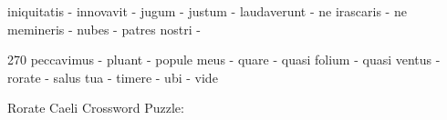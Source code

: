 \documentclass[12pt]{article}
\begin{document}
\pagestyle{fancy}
\fancyhf{}
\renewcommand{\headrulewidth}{0pt} %
  \renewcommand{\footrulewidth}{0pt}
\libertine
\renewcommand\PuzzleClueFont{\rm\normalsize}
\begin{rotate}{0}
\small  iniquitatis - innovavit - jugum - justum - laudaverunt - ne irascaris - ne memineris - nubes - patres nostri -
\end{rotate}
\hfill
\begin{rotate}{270}
\small  peccavimus - pluant - popule meus - quare - quasi folium - quasi ventus - rorate - salus tua - timere - ubi - vide
\end{rotate}
\begin{center}
  \huge{Rorate Caeli Crossword Puzzle:}
\end{center}
\vspace{1.5cm}
\end{document}
